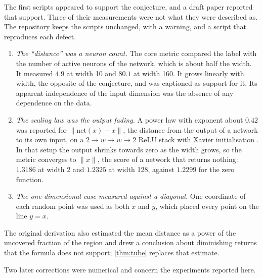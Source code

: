 The first scripts appeared to support the conjecture,
and a draft paper reported that support. Three of their measurements were not
what they were described as. The repository keeps the scripts unchanged, with a
warning, and a script that reproduces each defect.

\begin{enumerate}\setlength{\itemsep}{1pt}
\item \emph{The ``distance'' was a neuron count.} The core metric compared the
label with the number of active neurons of the network, which is about half the
width. It measured $4.9$ at width 10 and $80.1$ at width 160. It grows linearly
with width, the opposite of the conjecture, and was captioned as support for
it. Its apparent independence of the input dimension was the absence of any
dependence on the data.
\item \emph{The scaling law was the output fading.} A power law with exponent
about $0.42$ was reported for $\|\mathrm{net}(x)-x\|$, the distance from the
output of a network to its own input, on a $2\to w\to w\to2$ ReLU stack with
Xavier initialisation \citep{glorot2010understanding}. In that setup the output
shrinks towards zero as the width grows, so the metric converges to $\|x\|$, the
score of a network that returns nothing: $1.3186$ at width 2 and $1.2325$ at
width 128, against $1.2299$ for the zero function.
\item \emph{The one-dimensional case measured against a diagonal.} One
coordinate of each random point was used as both $x$ and $y$, which placed
every point on the line $y=x$.
\end{enumerate}

The original derivation also estimated the mean distance as a power of the
uncovered fraction of the region and drew a conclusion about diminishing returns
that the formula does not support; \cref{thm:tube} replaces that estimate.

Two later corrections were numerical and concern the experiments reported here.

